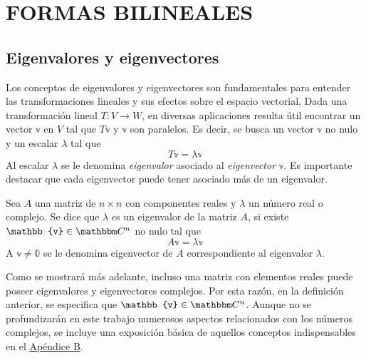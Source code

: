 \chapter{FORMAS BILINEALES}\label{chapter:bilineal}
\printchaptertableofcontents

\section{Eigenvalores y eigenvectores}

Los conceptos de eigenvalores y eigenvectores son fundamentales para entender las transformaciones lineales y sus efectos sobre el espacio vectorial. Dada una transformación lineal $T: V \longrightarrow W$, en diversas aplicaciones  resulta útil encontrar un vector $\mathbb{v}$ en $V$ tal que $T\mathbb{v}$ y $\mathbb{v}$ son paralelos. Es decir, se busca un vector $\mathbb{v}$ no nulo y un escalar $\lambda$ tal que
$$T\mathbb{v} = \lambda \mathbb{v}$$
Al escalar $\lambda$ se le denomina \emph{eigenvalor} asociado al \emph{eigenvector} $\mathbb{v}$. Es importante destacar que cada eigenvector puede tener asociado más de un eigenvalor.

\begin{definition}\label{def:eigenvalor}
    Sea $A$ una matriz de $n \times n$ con componentes reales y $\lambda$ un número real o complejo. Se dice que $\lambda$ es un eigenvalor de la matriz $A$, si existe $\mathbb{v} \in \CC[n]$ no nulo tal que
    $$A\mathbb{v} = \lambda \mathbb{v}$$
    A $\mathbb{v} \neq \mathbb{0}$ se le denomina eigenvector de $A$ correspondiente al eigenvalor $\lambda$.
\end{definition}

\begin{observation}
    Como se mostrará más adelante, incluso una matriz con elementos reales puede poseer eigenvalores y eigenvectores complejos. Por esta razón, en la definición anterior, se especifica que $\mathbb{v} \in \CC[n]$. Aunque no se profundizarán en este trabajo numerosos aspectos relacionados con los números complejos, se incluye una exposición básica de aquellos conceptos indispensables en el \hyperref[chap:numeros-complejos]{Apéndice B}.
\end{observation}

